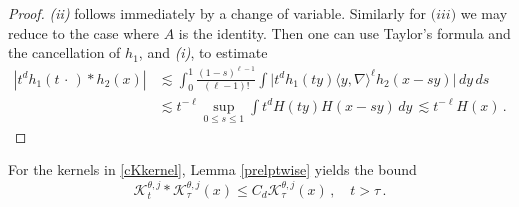 \documentclass[11pt]{amsart}
\theoremstyle{definition}
\numberwithin{theorem}{section}
\numberwithin{definition}{section}
\def\inn#1#2{\langle#1,#2\rangle}
\def\inn#1#2{\langle#1,#2\rangle}
\def\lc{\lesssim}
\def\cK{{\mathcal {K}}}
\begin{document}
\begin{proof}
\textit{(ii)} follows immediately by a change of variable.
Similarly for $\textit{(iii)}$ we may reduce to the case where $A$ is the identity. Then one can use  Taylor's formula and  the cancellation of $h_1$, and \textit{(i)},  to estimate
\begin{align*}
|t^dh_1(t\,\cdot\,)*h_2(x)|&\lc \int_0^1\frac{(1-s)^{\ell-1}}{(\ell-1)!} \int\big| t^dh_1(ty)
\inn{y}{\nabla }^\ell h_2 (x-sy)\big| \, dy\,ds\,
\\
&\lc t^{-\ell} \sup_{0\le s\le 1}\int t^dH(ty) H(x-sy) \, dy\,\lc t^{-\ell} H(x)\,.
\end{align*}
\end{proof}


\noindent For the kernels in \eqref{cKkernel}, Lemma
\ref{prelptwise} yields the bound
\begin{equation}\label{cKconv}\cK_{t}^{\theta,j}* \cK_{\tau}^{\theta,j}(x) \le C_d
 \cK_{\tau}^{\theta,j}(x)\,,\quad t>\tau\,.\end{equation}
\end{document}
